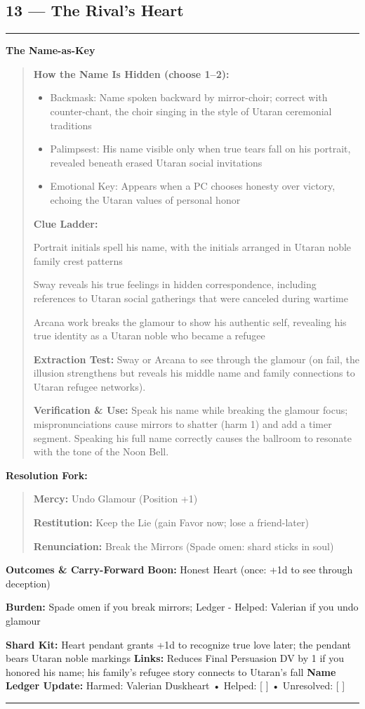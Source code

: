 \documentclass[18pt, letterpaper, twoside]{article}
\newenvironment{floorbox}[1]{%
    \begin{center}
    \begin{minipage}{0.95\textwidth}
    \subsection*{#1}
    \vspace{-0.5em}
    \rule{\textwidth}{0.5pt}
    \vspace{0.5em}
}{%
    \vspace{0.5em}
    \rule{\textwidth}{0.5pt}
    \end{minipage}
    \end{center}
}
\newenvironment{gmnote}[1]{%
    \vspace{0.5em}
    \noindent\textbf{#1}
    \begin{quote}
}{%
    \end{quote}
    \vspace{0.5em}
}
\newenvironment{resolutionbox}{%
    \vspace{0.5em}
    \noindent\textbf{Resolution Fork:}
    \begin{quote}
}{%
    \end{quote}
    \vspace{0.5em}
}
\newcommand{\boon}[1]{\noindent\textbf{Boon:} #1\par}
\newcommand{\burden}[1]{\noindent\textbf{Burden:} #1\par}
\begin{document}
\begin{floorbox}{13 --- The Rival's Heart}
\begin{gmnote}{The Name-as-Key}
\textbf{How the Name Is Hidden (choose 1--2):}
\begin{itemize}[leftmargin=*]
    \item Backmask: Name spoken backward by mirror-choir; correct with counter-chant, the choir singing in the style of Utaran ceremonial traditions
    \item Palimpsest: His name visible only when true tears fall on his portrait, revealed beneath erased Utaran social invitations
    \item Emotional Key: Appears when a PC chooses honesty over victory, echoing the Utaran values of personal honor
\end{itemize}

\textbf{Clue Ladder:}
\begin{description}[leftmargin=*, style=unboxed]
    \item[Gentle Nudge:] Portrait initials spell his name, with the initials arranged in Utaran noble family crest patterns
    \item[Actionable Lead:] Sway reveals his true feelings in hidden correspondence, including references to Utaran social gatherings that were canceled during wartime
    \item[Aha! Proof:] Arcana work breaks the glamour to show his authentic self, revealing his true identity as a Utaran noble who became a refugee
\end{description}

\textbf{Extraction Test:} Sway or Arcana to see through the glamour (on fail, the illusion strengthens but reveals his middle name and family connections to Utaran refugee networks).

\textbf{Verification \& Use:} Speak his name while breaking the glamour focus; mispronunciations cause mirrors to shatter (harm 1) and add a timer segment. Speaking his full name correctly causes the ballroom to resonate with the tone of the Noon Bell.
\end{gmnote}

\begin{resolutionbox}
\textbf{Mercy:} Undo Glamour (Position +1)

\textbf{Restitution:} Keep the Lie (gain Favor now; lose a friend-later)

\textbf{Renunciation:} Break the Mirrors (Spade omen: shard sticks in soul)
\end{resolutionbox}

\textbf{Outcomes \& Carry-Forward}
\boon{Honest Heart (once: +1d to see through deception)}
\burden{Spade omen if you break mirrors; Ledger - Helped: Valerian if you undo glamour}
\textbf{Shard Kit:} Heart pendant grants +1d to recognize true love later; the pendant bears Utaran noble markings
\textbf{Links:} Reduces Final Persuasion DV by 1 if you honored his name; his family's refugee story connects to Utaran's fall
\textbf{Name Ledger Update:} Harmed: Valerian Duskheart • Helped: [ ] • Unresolved: [ ]


\end{floorbox}
\end{document}
